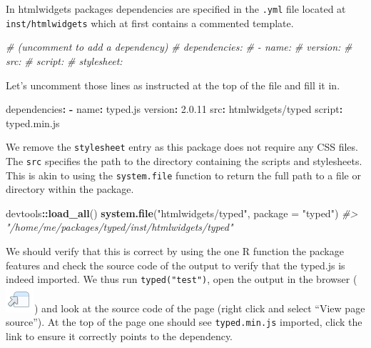\documentclass[
]{krantz}
\makeatletter
\newenvironment{Shaded}{\begin{snugshade}}{\end{snugshade}}
\newcommand{\AttributeTok}[1]{\textcolor[rgb]{0.61,0.61,0.61}{#1}}
\newcommand{\CommentTok}[1]{\textcolor[rgb]{0.37,0.37,0.37}{\textit{#1}}}
\newcommand{\DataTypeTok}[1]{\textcolor[rgb]{0.27,0.27,0.27}{#1}}
\newcommand{\FloatTok}[1]{\textcolor[rgb]{0.06,0.06,0.06}{#1}}
\newcommand{\FunctionTok}[1]{\textcolor[rgb]{0,0,0}{#1}}
\newcommand{\KeywordTok}[1]{\textcolor[rgb]{0.27,0.27,0.27}{\textbf{#1}}}
\newcommand{\NormalTok}[1]{#1}
\newcommand{\OperatorTok}[1]{\textcolor[rgb]{0.43,0.43,0.43}{\textbf{#1}}}
\newcommand{\StringTok}[1]{\textcolor[rgb]{0.5,0.5,0.5}{#1}}
\newenvironment{kframe}{%
\medskip{}
\setlength{\fboxsep}{.8em}
 \def\at@end@of@kframe{}%
 \ifinner\ifhmode%
  \def\at@end@of@kframe{\end{minipage}}%
  \begin{minipage}{\columnwidth}%
 \fi\fi%
 \def\FrameCommand##1{\hskip\@totalleftmargin \hskip-\fboxsep
 \colorbox{shadecolor}{##1}\hskip-\fboxsep
     \hskip-\linewidth \hskip-\@totalleftmargin \hskip\columnwidth}%
 \MakeFramed {\advance\hsize-\width
   \@totalleftmargin\z@ \linewidth\hsize
   \@setminipage}}%
 {\par\unskip\endMakeFramed%
 \at@end@of@kframe}
\renewenvironment{Shaded}{\begin{kframe}}{\end{kframe}}
\makeatother
\begin{document}
In htmlwidgets packages dependencies are specified in the \texttt{.yml} file located at \texttt{inst/htmlwidgets} which at first contains a commented template.

\begin{Shaded}
\begin{Highlighting}[]
\CommentTok{\# (uncomment to add a dependency)}
\CommentTok{\# dependencies:}
\CommentTok{\#  {-} name:}
\CommentTok{\#    version:}
\CommentTok{\#    src:}
\CommentTok{\#    script:}
\CommentTok{\#    stylesheet:}
\end{Highlighting}
\end{Shaded}

Let's uncomment those lines as instructed at the top of the file and fill it in.

\begin{Shaded}
\begin{Highlighting}[]
\FunctionTok{dependencies}\KeywordTok{:}
\AttributeTok{  }\KeywordTok{{-}}\AttributeTok{ }\FunctionTok{name}\KeywordTok{:}\AttributeTok{ typed.js}
\AttributeTok{    }\FunctionTok{version}\KeywordTok{:}\AttributeTok{ }\FloatTok{2.0.11}
\AttributeTok{    }\FunctionTok{src}\KeywordTok{:}\AttributeTok{ htmlwidgets/typed}
\AttributeTok{    }\FunctionTok{script}\KeywordTok{:}\AttributeTok{ typed.min.js}
\end{Highlighting}
\end{Shaded}

We remove the \texttt{stylesheet} entry as this package does not require any CSS files. The \texttt{src} specifies the path to the directory containing the scripts and stylesheets. This is akin to using the \texttt{system.file} function to return the full path to a file or directory within the package.

\begin{Shaded}
\begin{Highlighting}[]
\NormalTok{devtools}\OperatorTok{::}\KeywordTok{load\_all}\NormalTok{()}
\KeywordTok{system.file}\NormalTok{(}\StringTok{"htmlwidgets/typed"}\NormalTok{, }\DataTypeTok{package =} \StringTok{"typed"}\NormalTok{)                                         }
\CommentTok{\#\textgreater{} "/home/me/packages/typed/inst/htmlwidgets/typed"}
\end{Highlighting}
\end{Shaded}

We should verify that this is correct by using the one R function the package features and check the source code of the output to verify that the typed.js is indeed imported. We thus run \texttt{typed("test")}, open the output in the browser (\includegraphics{images/open-in-browser.png}) and look at the source code of the page (right click and select ``View page source''). At the top of the page one should see \texttt{typed.min.js} imported, click the link to ensure it correctly points to the dependency.
\end{document}
